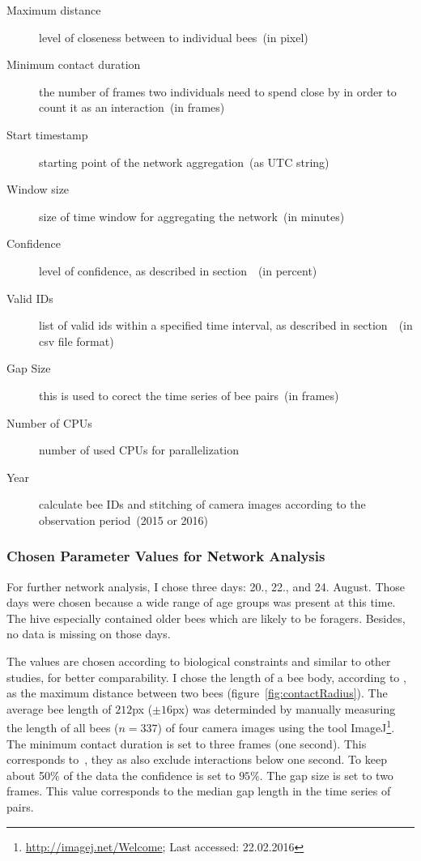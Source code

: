 \begin{description}
\item[Maximum distance] level of closeness between to individual bees~(in pixel)
\item[Minimum contact duration] the number of frames two individuals need to spend close by in order to count it as an interaction~(in frames)
\item [Start timestamp] starting point of the network aggregation~(as UTC string)
\item [Window size] size of time window for aggregating the network~(in minutes)

\vspace{5mm}

\item[Confidence] level of confidence, as described in section~~(in percent)
\item[Valid IDs] list of valid ids within a specified time interval, as described in section~~(in csv file format)
\item[Gap Size] this is used to corect the time series of bee pairs~(in frames)
\item[Number of CPUs] number of used CPUs for parallelization
\item[Year] calculate bee IDs and stitching of camera images according to the observation period~(2015 or 2016)
\end{description}

\subsubsection{Chosen Parameter Values for Network Analysis}


For further network analysis, I chose three days: 20., 22., and 24. August.
Those days were chosen because a wide range of age groups was present at this time. The hive especially contained older bees which are likely to be foragers. Besides, no data is missing on those days.

The values are chosen according to biological constraints and similar to other studies, for better comparability.
I chose the length of a bee body, according to \textcite{baracchi2014socio}, as the maximum distance between two bees (figure~\ref{fig:contactRadius}). The average bee length of $212$px ($\pm 16$px)  was determinded by manually measuring the length of all bees ($n=337$) of four camera images using the tool ImageJ\footnote{\url{http://imagej.net/Welcome}; Last accessed:
 22.02.2016}.
The minimum contact duration is set to three frames (one second). This corresponds to~\textcite{mersch2013tracking}, they as also exclude interactions below one second.
To keep about 50\% of the data the confidence is set to $95\%$.
The gap size is set to two frames. This value corresponds to the median gap length in the time series of pairs.

